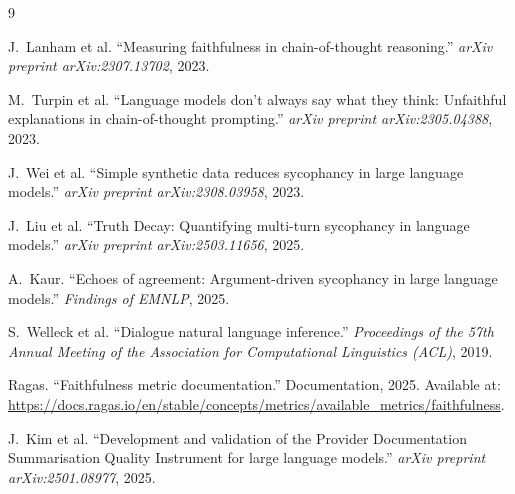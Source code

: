 \documentclass[11pt,a4paper]{article}
\begin{document}
\clearpage
\begin{thebibliography}{9}

J.~Lanham et al. ``Measuring faithfulness in chain-of-thought reasoning.'' \textit{arXiv preprint arXiv:2307.13702}, 2023.

M.~Turpin et al. ``Language models don't always say what they think: Unfaithful explanations in chain-of-thought prompting.'' \textit{arXiv preprint arXiv:2305.04388}, 2023.

J.~Wei et al. ``Simple synthetic data reduces sycophancy in large language models.'' \textit{arXiv preprint arXiv:2308.03958}, 2023.

J.~Liu et al. ``Truth Decay: Quantifying multi-turn sycophancy in language models.'' \textit{arXiv preprint arXiv:2503.11656}, 2025.

A.~Kaur. ``Echoes of agreement: Argument-driven sycophancy in large language models.'' \textit{Findings of EMNLP}, 2025.

S.~Welleck et al. ``Dialogue natural language inference.'' \textit{Proceedings of the 57th Annual Meeting of the Association for Computational Linguistics (ACL)}, 2019.

Ragas. ``Faithfulness metric documentation.'' Documentation, 2025. Available at: \url{https://docs.ragas.io/en/stable/concepts/metrics/available_metrics/faithfulness}.

J.~Kim et al. ``Development and validation of the Provider Documentation Summarisation Quality Instrument for large language models.'' \textit{arXiv preprint arXiv:2501.08977}, 2025.

\end{thebibliography}
\end{document}
